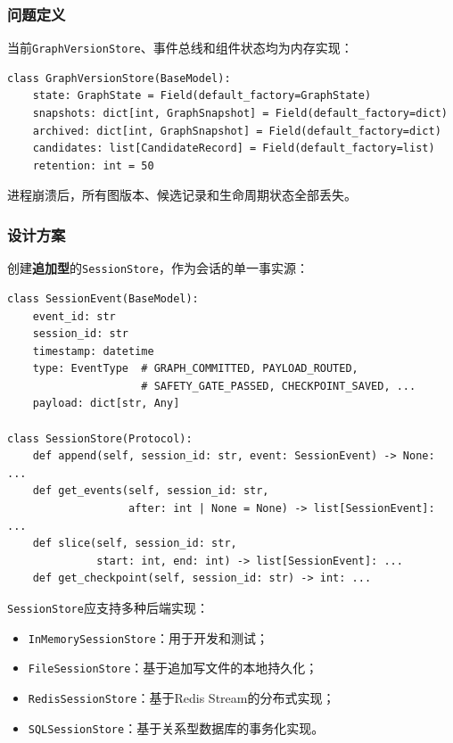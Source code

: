 \documentclass[12pt,a4paper]{ctexart}
\begin{document}
\subsubsection{问题定义}

当前\texttt{GraphVersionStore}、事件总线和组件状态均为内存实现：

\begin{lstlisting}[caption={当前内存中的版本存储}]
class GraphVersionStore(BaseModel):
    state: GraphState = Field(default_factory=GraphState)
    snapshots: dict[int, GraphSnapshot] = Field(default_factory=dict)
    archived: dict[int, GraphSnapshot] = Field(default_factory=dict)
    candidates: list[CandidateRecord] = Field(default_factory=list)
    retention: int = 50
\end{lstlisting}

进程崩溃后，所有图版本、候选记录和生命周期状态全部丢失。

\subsubsection{设计方案}

创建\textbf{追加型}的\texttt{SessionStore}，作为会话的单一事实源：

\begin{lstlisting}[caption={提议的SessionStore接口}]
class SessionEvent(BaseModel):
    event_id: str
    session_id: str
    timestamp: datetime
    type: EventType  # GRAPH_COMMITTED, PAYLOAD_ROUTED,
                     # SAFETY_GATE_PASSED, CHECKPOINT_SAVED, ...
    payload: dict[str, Any]

class SessionStore(Protocol):
    def append(self, session_id: str, event: SessionEvent) -> None: ...
    def get_events(self, session_id: str,
                   after: int | None = None) -> list[SessionEvent]: ...
    def slice(self, session_id: str,
              start: int, end: int) -> list[SessionEvent]: ...
    def get_checkpoint(self, session_id: str) -> int: ...
\end{lstlisting}

\texttt{SessionStore}应支持多种后端实现：
\begin{itemize}
    \item \texttt{InMemorySessionStore}：用于开发和测试；
    \item \texttt{FileSessionStore}：基于追加写文件的本地持久化；
    \item \texttt{RedisSessionStore}：基于Redis Stream的分布式实现；
    \item \texttt{SQLSessionStore}：基于关系型数据库的事务化实现。
\end{itemize}
\end{document}
